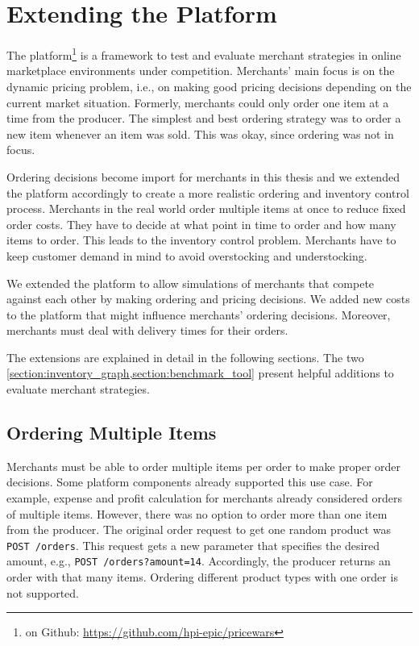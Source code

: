 
\chapter{Extending the \pricewars Platform}
\label{section:platform_extension}

The \pricewars platform\footnote{\pricewars on Github: \url{https://github.com/hpi-epic/pricewars}} is a framework to test and evaluate merchant strategies in online marketplace environments under competition.
Merchants' main focus is on the dynamic pricing problem, i.e., on making good pricing decisions depending on the current market situation.
Formerly, merchants could only order one item at a time from the producer.
The simplest and best ordering strategy was to order a new item whenever an item was sold.
This was okay, since ordering was not in focus.

Ordering decisions become import for merchants in this thesis and we extended the \pricewars platform accordingly to create a more realistic ordering and inventory control process.
Merchants in the real world order multiple items at once to reduce fixed order costs.
They have to decide at what point in time to order and how many items to order.
This leads to the inventory control problem.
Merchants have to keep customer demand in mind to avoid overstocking and understocking.

We extended the \pricewars platform to allow simulations of merchants that compete against each other by making ordering and pricing decisions.
We added new costs to the platform that might influence merchants' ordering decisions.
Moreover, merchants must deal with delivery times for their orders.

The extensions are explained in detail in the following sections.
The two \cref{section:inventory_graph,section:benchmark_tool} present helpful additions to evaluate merchant strategies.

\section{Ordering Multiple Items}
\label{section:multiple_items}
Merchants must be able to order multiple items per order to make proper order decisions.
Some platform components already supported this use case.
For example, expense and profit calculation for merchants already considered orders of multiple items.
However, there was no option to order more than one item from the producer.
The original order request to get one random product was \texttt{POST /orders}.
This request gets a new parameter that specifies the desired amount, e.g., \texttt{POST /orders?amount=14}.
Accordingly, the producer returns an order with that many items.
Ordering different product types with one order is not supported.

